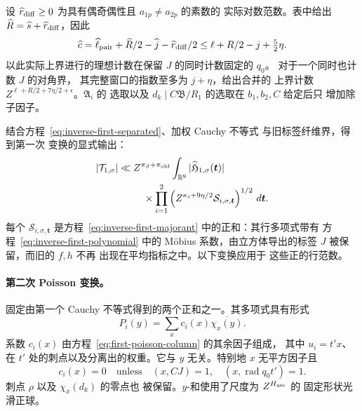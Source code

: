 设 \(\widehat r_{\rm diff}\ge0\) 为具有偶奇偶性且 \(a_{1p}\ne a_{2p}\) 的素数的
实际对数范数。表中给出
\(\widehat R=\widehat s+\widehat r_{\rm diff}\)，因此
\begin{equation}\label{eq:fixed-cube-count}
 \widehat c=\widehat\ell_{\rm pair}+\widehat R/2-\widehat j
                  -\widehat r_{\rm diff}/2
 \le\ell+R/2-j+\tfrac52\eta.
\end{equation}
以此实际上界进行的理想计数在保留 \(J\) 的同时计数固定的 \(q_0\)。
对于一个同时也计数 \(J\) 的对角界，
其完整窗口的指数至多为 \(j+\eta\)，给出合并的
上界计数 \(Z^{\ell+R/2+7\eta/2+\epsilon}\)。\(\mathfrak A_i\) 的
选取以及 \(d_k\mid C\mathfrak B/R_1\) 的选取在 \(b_1,b_2,C\) 给定后只
增加除子因子。

结合方程~\eqref{eq:inverse-first-separated}、加权 Cauchy 不等式
与旧标签纤维界，得到第一次
变换的显式输出：
\begin{equation}\label{eq:inverse-first-transform-output}
 \begin{split}
 |\mathcal T_{1,\sigma}|\ll{}&Z^{\pi_\beta+\pi_{\rm old}}
 \int_{\mathbb R^9}|\widehat{\mathfrak H}_{1,\sigma}(\boldsymbol t)|\\
 &\quad\times\prod_{i=1}^2
 \left(Z^{\kappa_i+9\eta/2}\mathcal S_{i,\sigma,\boldsymbol t}\right)^{1/2}
 \,d\boldsymbol t.
 \end{split}
\end{equation}
每个 \(\mathcal S_{i,\sigma,\boldsymbol t}\) 是方程~\eqref{eq:inverse-first-majorant}
中的正和：其行多项式带有
方程~\eqref{eq:inverse-first-polynomial} 中的
M\"obius 系数，由立方体导出的标签 \(J\) 被保留，而旧的 \(f,h\) 不再
出现在平均指标之中。以下变换应用于
这些正的行范数。

\paragraph{第二次 Poisson 变换。}
固定由第一个 Cauchy
不等式得到的两个正和之一。其多项式具有形式
\[
 P_i(y)=\sum_x c_i(x)\overline{\chi_x(y)}.
\]
系数 \(c_i(x)\) 由方程~\eqref{eq:first-poisson-column} 的其余因子组成，
其中 \(u_i=t'x\)、在 \(t'\) 处的刺点以及分离出的权重。它与
\(y\) 无关。特别地 \(x\) 无平方因子且
\[
 c_i(x)=0\quad\text{unless}\quad
 (x,CJ)=1,\quad (x,\operatorname{rad}q_0t')=1.
\]
刺点 \(\rho\) 以及 \(\chi_x(d_k)\) 的零点也
被保留。\(y\)-和使用了尺度为 \(Z^{H_{\rm use}}\) 的
固定形状光滑正球。

